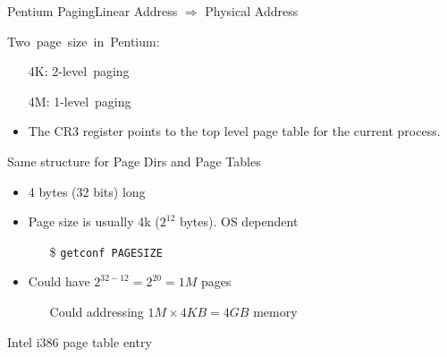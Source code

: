 \begin{frame}{Pentium Paging}{Linear Address $\Rightarrow$ Physical Address}
  \begin{minipage}{.4\textwidth}
    \mbox{Two page size in Pentium:}
    \begin{small}
      \begin{itemize}
      \item[4K:] \mbox{2-level paging}%
      \item[4M:] \mbox{1-level paging}%
      \end{itemize}
    \end{small}
    \begin{center}
    \end{center}
  \end{minipage}\qquad
  \begin{minipage}{.5\textwidth}
    \begin{center}
    \end{center}
  \end{minipage}
\end{frame}

\begin{itemize}
\item The CR3 register points to the top level page table for the current process.
\end{itemize}

\begin{frame}%
  \begin{block}{Same structure for Page Dirs and Page Tables}
    \begin{itemize}
    \item 4 bytes (32 bits) long
    \item Page size is usually 4k ($2^{12}$ bytes). OS dependent
      \begin{itemize}
      \item[\$] \texttt{getconf PAGESIZE}
      \end{itemize}
    \item Could have $2^{32-12}=2^{20}=1M$ pages
      \begin{itemize}
      \item[] Could addressing $1M\times{}4KB=4GB$ memory
      \end{itemize}
    \end{itemize}
  \end{block}
  \begin{block}{Intel i386 page table entry}
    \begin{center}
    \end{center}
  \end{block}
\end{frame}

